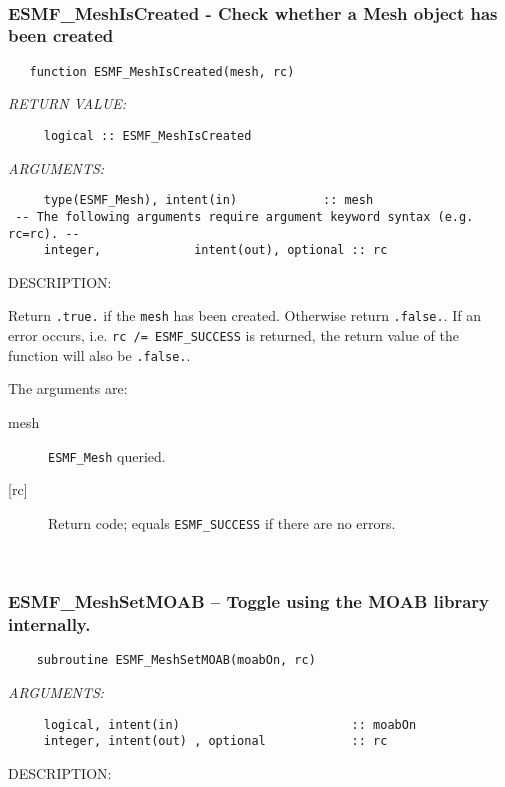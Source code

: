  
\mbox{}\hrulefill\ 
 
\subsubsection [ESMF\_MeshIsCreated] {ESMF\_MeshIsCreated - Check whether a Mesh object has been created}


 
\begin{verbatim}   function ESMF_MeshIsCreated(mesh, rc)\end{verbatim}{\em RETURN VALUE:}
\begin{verbatim}     logical :: ESMF_MeshIsCreated\end{verbatim}{\em ARGUMENTS:}
\begin{verbatim}     type(ESMF_Mesh), intent(in)            :: mesh
 -- The following arguments require argument keyword syntax (e.g. rc=rc). --
     integer,             intent(out), optional :: rc
 \end{verbatim}
{\sf DESCRIPTION:\\ }


     Return {\tt .true.} if the {\tt mesh} has been created. Otherwise return
     {\tt .false.}. If an error occurs, i.e. {\tt rc /= ESMF\_SUCCESS} is
     returned, the return value of the function will also be {\tt .false.}.
  
   The arguments are:
     \begin{description}
     \item[mesh]
       {\tt ESMF\_Mesh} queried.
     \item[{[rc]}]
       Return code; equals {\tt ESMF\_SUCCESS} if there are no errors.
     \end{description}
   
 
\mbox{}\hrulefill\ 
 
\subsubsection [ESMF\_MeshSetMOAB] {ESMF\_MeshSetMOAB -- Toggle using the MOAB library internally.}


  
\begin{verbatim}    subroutine ESMF_MeshSetMOAB(moabOn, rc)\end{verbatim}{\em ARGUMENTS:}
\begin{verbatim}     logical, intent(in)                        :: moabOn
     integer, intent(out) , optional            :: rc\end{verbatim}
{\sf DESCRIPTION:\\ }


